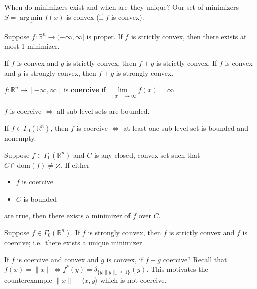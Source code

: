 \documentclass[english, 11pt]{article}
\DeclareMathOperator*{\argmin}{arg\,min}
\begin{document}
\begin{rem}
When do minimizers exist and when are they unique? Our set of minimizers $S=\argmin \limits_x f(x)$ is convex (if $f$ is convex).
\end{rem}


\begin{cor}[11.8 B+C]
Suppose $f:\mathbb{R}^n \to (-\infty,\infty]$ is proper. If $f$ is strictly convex, then there exists at most 1 minimizer.
\end{cor}


\begin{thrm}
If $f$ is convex and $g$ is strictly convex, then $f+g$ is strictly convex. If $f$ is convex and $g$ is strongly convex, then $f+g$ is strongly convex.
\end{thrm}

\begin{defn}[Coercive]
$f:\mathbb{R}^n \to [-\infty,\infty]$ is {\bf coercive} if $\lim \limits_{\|x\|\to \infty} f(x) = \infty$.
\end{defn}

\begin{thrm}
$f$ is coercive $\iff$ all sub-level sets are bounded.
\end{thrm}

\begin{thrm}
If $f \in \Gamma_0(\mathbb{R}^n)$, then $f$ is coercive $\iff$ at least one sub-level set is bounded and nonempty.
\end{thrm}


\begin{thrm}
Suppose $f \in \Gamma_0(\mathbb{R}^n)$ and $C$ is any closed, convex set such that $C \cap \text{dom}(f) \neq \varnothing$. If either
\begin{itemize}
\item $f$ is coercive
\item $C$ is bounded
\end{itemize}
are true, then there exists a minimizer of $f$ over $C$.
\end{thrm}

\begin{cor}
Suppose $f \in \Gamma_0(\mathbb{R}^n)$. If $f$ is strongly convex, then $f$ is strictly convex and $f$ is coercive; i.e.\ there exists a unique minimizer.
\end{cor}

\begin{rem}
If $f$ is coercive and convex and $g$ is convex, if $f+g$ coercive? Recall that $f(x) = \|x\| \iff f^*(y) = \delta_{ \{y \mid \|y\|_* \le 1 \} }(y)$. This motivates the counterexample $\|x\| - \langle x,y \rangle$ which is not coercive.
\end{rem}
\end{document}
